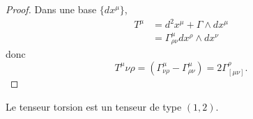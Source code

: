 \documentclass[a4paper,11pt]{report}
\begin{document}
                \begin{proof}
                    Dans une base $\{dx^\mu\}$,
                    \begin{align}
                        T^\mu &= d^2x^\mu + \Gamma\wedge dx^\mu\\
                        &= \Gamma^\mu_{\rho\nu}dx^\rho\wedge dx^\nu
                    \end{align}
                    donc
                    \begin{equation}
                        T^\mu{\nu\rho} = \left( \Gamma^\mu_{\nu\rho}-\Gamma^\mu_{\rho\nu} \right) = 2\Gamma^\rho_{[\mu\nu]}.
                    \end{equation}
                \end{proof}
                
                \begin{prop}\begin{leftbar}
                    Le tenseur torsion est un tenseur de type $(1,2)$.
                \end{leftbar}\end{prop}
                
\end{document}
